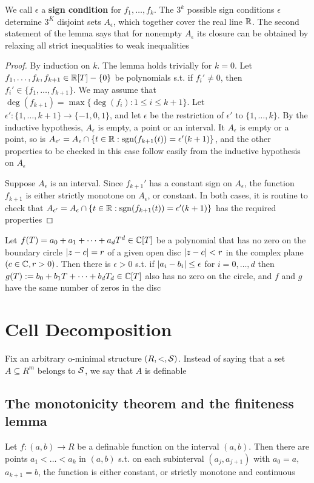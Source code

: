 \documentclass[11pt]{article}
\begin{document}
We call \(\epsilon\) a \textbf{sign condition} for \(f_1,\dots,f_k\). The \(3^k\) possible sign conditions \(\epsilon\)
determine \(3^K\) disjoint sets \(A_\epsilon\), which together cover the real line \(\mathbb{R}\). The second
statement of the lemma says that for nonempty \(A_\epsilon\) its closure can be obtained by relaxing
all strict inequalities to weak inequalities

\begin{proof}
By induction on \(k\). The lemma holds trivially for \(k=0\). Let \(f_1,\dots,f_k,f_{k+1}\in\mathbb{R}[T]-\{0\}\)
be polynomials s.t. if \(f_i'\neq 0\), then \(f_i'\in\{f_1,\dots,f_{k+1}\}\). We may assume
that \(\deg(f_{k+1})=\max\{\deg(f_i):1\le i\le k+1\}\). Let \(\epsilon':\{1,\dots,k+1\}\to\{-1,0,1\}\), and let \(\epsilon\) be the
restriction of \(\epsilon'\) to \(\{1,\dots,k\}\). By the inductive hypothesis, \(A_\epsilon\) is empty, a point or
an interval. It \(A_\epsilon\) is empty or a point, so
is \(A_{\epsilon'}=A_\epsilon\cap\{t\in\mathbb{R}:\operatorname{sgn}(f_{k+1}(t))=\epsilon'(k+1)\}\), and the other properties to be checked in this
case follow easily from the inductive hypothesis on \(A_\epsilon\)

Suppose \(A_\epsilon\) is an interval. Since \(f_{k+1}'\) has a constant sign on \(A_\epsilon\), the
function \(f_{k+1}\) is either strictly monotone on \(A_\epsilon\), or constant. In both cases, it is
routine to check that \(A_{\epsilon'}=A_\epsilon\cap\{t\in\mathbb{R}:\operatorname{sgn}(f_{k+1}(t))=\epsilon'(k+1)\}\) has the required properties
\end{proof}

\begin{lemma}
Let \(f(T)=a_0+a_1+\dots+a_dT^d\in\mathbb{C}[T]\) be a polynomial that has no zero on the boundary
circle \(\abs{z-c}=r\) of a given open disc \(\abs{z-c}<r\) in the complex plane \((c\in\mathbb{C},r>0)\).
Then there is \(\epsilon>0\) s.t. if \(\abs{a_i-b_i}\le\epsilon\) for \(i=0,\dots,d\)
then \(g(T):=b_0+b_1T+\dots+b_dT_d\in\mathbb{C}[T]\) also has no zero on the circle, and \(f\) and \(g\) have
the same number of zeros in the disc
\end{lemma}
\section{Cell Decomposition}
\label{sec:orga2183d8}
Fix an arbitrary o-minimal structure \((R,<,\mathcal{S})\). Instead of saying that a set \(A\subseteq R^m\) belongs
to \(\mathcal{S}\), we say that \(A\) is definable
\subsection{The monotonicity theorem and the finiteness lemma}
\label{sec:orgd01ad7f}
\begin{theorem}
Let \(f:(a,b)\to R\) be a definable function on the interval \((a,b)\). Then there are
points \(a_1<\dots<a_k\) in \((a,b)\) s.t. on each subinterval \((a_j,a_{j+1})\)
with \(a_0=a\), \(a_{k+1}=b\), the function is either constant, or strictly monotone and continuous
\end{theorem}
\end{document}
